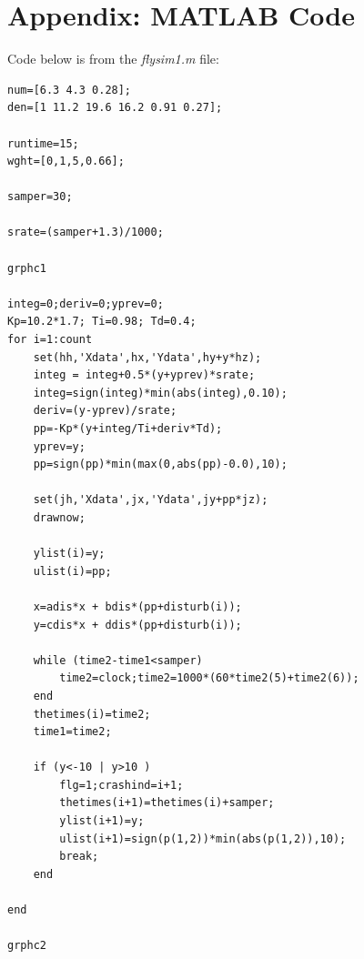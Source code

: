 \documentclass{article}
\begin{document}
\section{Appendix: MATLAB Code}
Code below is from the \textit{flysim1.m} file:
\begin{lstlisting}
num=[6.3 4.3 0.28];
den=[1 11.2 19.6 16.2 0.91 0.27];

runtime=15;
wght=[0,1,5,0.66];

samper=30;

srate=(samper+1.3)/1000;

grphc1

integ=0;deriv=0;yprev=0;
Kp=10.2*1.7; Ti=0.98; Td=0.4;
for i=1:count
	set(hh,'Xdata',hx,'Ydata',hy+y*hz);
    integ = integ+0.5*(y+yprev)*srate;
    integ=sign(integ)*min(abs(integ),0.10);
    deriv=(y-yprev)/srate;
    pp=-Kp*(y+integ/Ti+deriv*Td);
    yprev=y;
	pp=sign(pp)*min(max(0,abs(pp)-0.0),10);

	set(jh,'Xdata',jx,'Ydata',jy+pp*jz);
	drawnow;

	ylist(i)=y;
	ulist(i)=pp;

	x=adis*x + bdis*(pp+disturb(i));
	y=cdis*x + ddis*(pp+disturb(i));

	while (time2-time1<samper)
		time2=clock;time2=1000*(60*time2(5)+time2(6));
	end
	thetimes(i)=time2;
	time1=time2;

	if (y<-10 | y>10 )
		flg=1;crashind=i+1;
		thetimes(i+1)=thetimes(i)+samper;
		ylist(i+1)=y;
		ulist(i+1)=sign(p(1,2))*min(abs(p(1,2)),10);
		break;
	end

end

grphc2
\end{lstlisting}
\end{document}
